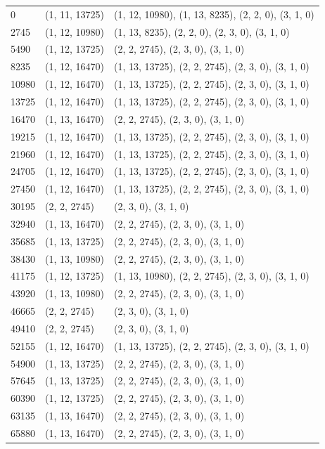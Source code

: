 \documentclass[oneside]{utmthesis}
\begin{document}
\begin{center}
\begin{longtable}{|l|l|l|}
0 & (1, 11, 13725) & (1, 12, 10980), (1, 13, 8235), (2, 2, 0), (3, 1, 0) \\
2745 & (1, 12, 10980) & (1, 13, 8235), (2, 2, 0), (2, 3, 0), (3, 1, 0) \\
5490 & (1, 12, 13725) & (2, 2, 2745), (2, 3, 0), (3, 1, 0) \\
8235 & (1, 12, 16470) & (1, 13, 13725), (2, 2, 2745), (2, 3, 0), (3, 1, 0) \\
10980 & (1, 12, 16470) & (1, 13, 13725), (2, 2, 2745), (2, 3, 0), (3, 1, 0) \\
13725 & (1, 12, 16470) & (1, 13, 13725), (2, 2, 2745), (2, 3, 0), (3, 1, 0) \\
16470 & (1, 13, 16470) & (2, 2, 2745), (2, 3, 0), (3, 1, 0) \\
19215 & (1, 12, 16470) & (1, 13, 13725), (2, 2, 2745), (2, 3, 0), (3, 1, 0) \\
21960 & (1, 12, 16470) & (1, 13, 13725), (2, 2, 2745), (2, 3, 0), (3, 1, 0) \\
24705 & (1, 12, 16470) & (1, 13, 13725), (2, 2, 2745), (2, 3, 0), (3, 1, 0) \\
27450 & (1, 12, 16470) & (1, 13, 13725), (2, 2, 2745), (2, 3, 0), (3, 1, 0) \\
30195 & (2, 2, 2745) & (2, 3, 0), (3, 1, 0) \\
32940 & (1, 13, 16470) & (2, 2, 2745), (2, 3, 0), (3, 1, 0) \\
35685 & (1, 13, 13725) & (2, 2, 2745), (2, 3, 0), (3, 1, 0) \\
38430 & (1, 13, 10980) & (2, 2, 2745), (2, 3, 0), (3, 1, 0) \\
41175 & (1, 12, 13725) & (1, 13, 10980), (2, 2, 2745), (2, 3, 0), (3, 1, 0) \\
43920 & (1, 13, 10980) & (2, 2, 2745), (2, 3, 0), (3, 1, 0) \\
46665 & (2, 2, 2745) & (2, 3, 0), (3, 1, 0) \\
49410 & (2, 2, 2745) & (2, 3, 0), (3, 1, 0) \\
52155 & (1, 12, 16470) & (1, 13, 13725), (2, 2, 2745), (2, 3, 0), (3, 1, 0) \\
54900 & (1, 13, 13725) & (2, 2, 2745), (2, 3, 0), (3, 1, 0) \\
57645 & (1, 13, 13725) & (2, 2, 2745), (2, 3, 0), (3, 1, 0) \\
60390 & (1, 12, 13725) & (2, 2, 2745), (2, 3, 0), (3, 1, 0) \\
63135 & (1, 13, 16470) & (2, 2, 2745), (2, 3, 0), (3, 1, 0) \\
65880 & (1, 13, 16470) & (2, 2, 2745), (2, 3, 0), (3, 1, 0) \\

\end{longtable}
\end{center}
\end{document}
